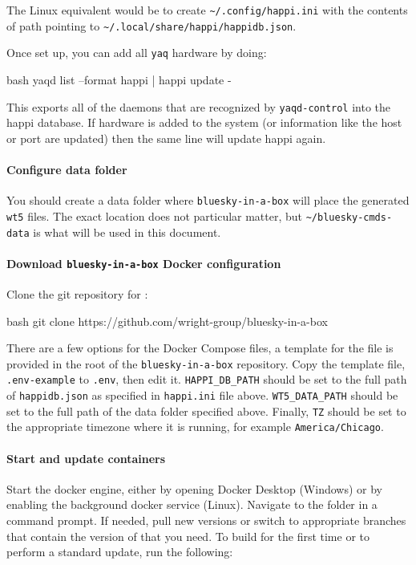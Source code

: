 The Linux equivalent would be to create \nolinkurl{~/.config/happi.ini} with the contents of path pointing to \nolinkurl{~/.local/share/happi/happidb.json}.

Once set up, you can add all \texttt{yaq} hardware by doing:

\begin{codefragment}{bash}
yaqd list --format happi | happi update -
\end{codefragment}

This exports all of the daemons that are recognized by \texttt{yaqd-control} into the happi database.
If hardware is added to the system (or information like the host or port are updated) then the same line will update happi again.

\paragraph{Configure data folder}

You should create a data folder where \texttt{bluesky-in-a-box} will place the generated \texttt{wt5} files.
The exact location does not particular matter, but \nolinkurl{~/bluesky-cmds-data} is what will be used in this document.

\paragraph{Download \texttt{bluesky-in-a-box} Docker configuration}

Clone the git repository for \biab:

\begin{codefragment}{bash}
git clone https://github.com/wright-group/bluesky-in-a-box
\end{codefragment}

There are a few options for the Docker Compose files, a template for the file is provided in the root of the \texttt{bluesky-in-a-box} repository.
Copy the template file, \nolinkurl{.env-example} to \nolinkurl{.env}, then edit it.
\texttt{HAPPI\_DB\_PATH} should be set to the full path of \nolinkurl{happidb.json} as specified in \nolinkurl{happi.ini} file above.
\texttt{WT5\_DATA\_PATH} should be set to the full path of the data folder specified above.
Finally, \texttt{TZ} should be set to the appropriate timezone where it is running, for example \texttt{America/Chicago}.


\paragraph{Start and update containers}
Start the docker engine, either by opening Docker Desktop (Windows) or by enabling the background docker service (Linux).
Navigate to the \biab folder in a command prompt.
If needed, pull new versions or switch to appropriate branches that contain the version of \biab that you need.
To build for the first time or to perform a standard update, run the following:

